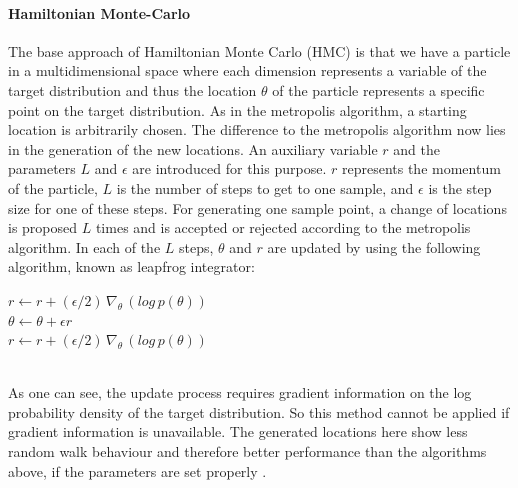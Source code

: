 \documentclass{article}
\begin{document}
\paragraph{Hamiltonian Monte-Carlo}
The base approach of Hamiltonian Monte Carlo (HMC) is that we have a particle in a multidimensional space where each dimension represents a variable of the target distribution and thus the location $\theta$ of the particle represents a specific point on the target distribution. As in the metropolis algorithm, a starting location is arbitrarily chosen. The difference to the metropolis algorithm now lies in the generation of the new locations. An auxiliary variable $r$ and the parameters $L$ and $\epsilon$ are introduced for this purpose. $r$ represents the momentum of the particle, $L$ is the number of steps to get to one sample, and $\epsilon$ is the step size for one of these steps. For generating one sample point, a change of locations is proposed $L$ times and is accepted or rejected according to the metropolis algorithm. In each of the $L$ steps, $\theta$ and $r$ are updated by using the following algorithm, known as leapfrog integrator: 
\begin{algorithm}[h]
	$r \leftarrow r + (\epsilon/2)  \, \nabla_\theta \, (log \, p(\theta))$\\
	$\theta \leftarrow \theta + \epsilon r$\\
	$r \leftarrow r + (\epsilon/2) \, \nabla_\theta \, (log \, p(\theta))$
\end{algorithm}
\\ 
As one can see, the update process requires gradient information on the log probability density of the target distribution. So this method cannot be applied if gradient information is unavailable. The generated locations here show less random walk behaviour and therefore better performance than the algorithms above, if the parameters are set properly \cite{hoffman2014no}.




\end{document}
